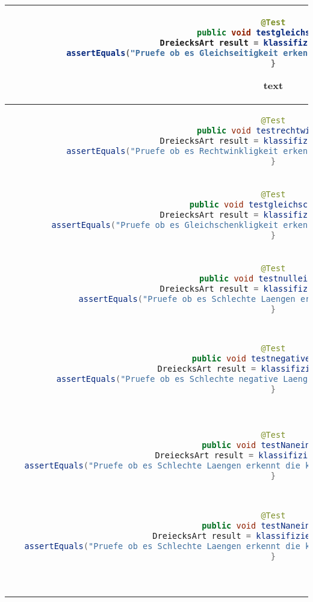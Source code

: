 \begin{parlist}
\begin{center}
\begin{tabular}{ | c | c | }
\begin{lstlisting}[language=java,frame=trBL]
@Test
public void testgleichseitig(){
   DreiecksArt result = klassifiziereDreieck(4,4,4);
   assertEquals("Pruefe ob es Gleichseitigkeit erkennt", DriecksArt.Gliechseitig, result);
}
  \end{lstlisting} text& Need to check if it can recognize equallateral triangles. \\ 
  \hline
  \begin{lstlisting}[language=java,frame=trBL]
@Test
public void testrechtwinklig(){
   DreiecksArt result = klassifiziereDreieck(3,4,5);
   assertEquals("Pruefe ob es Rechtwinkligkeit erkennt", DriecksArt.Rechtwinklig, result);
}
  \end{lstlisting} & Need to check if it can recognize right triangles. \\ 
  \hline
  \begin{lstlisting}[language=java,frame=trBL]
@Test
public void testgleichschenklig(){
   DreiecksArt result = klassifiziereDreieck(4,4,5);
   assertEquals("Pruefe ob es Gleichschenkligkeit erkennt", DriecksArt.Gleichschenklig, result);
}
  \end{lstlisting} &  Need to check if it can recognize isosceles triangles. \\ 
  \hline
  \begin{lstlisting}[language=java,frame=trBL]
@Test
public void testnulleingabe(){
   DreiecksArt result = klassifiziereDreieck(0,4,5);
   assertEquals("Pruefe ob es Schlechte Laengen erkennt", DriecksArt.Normal, result);
}
  \end{lstlisting} &  Need to check if it can recognize invalid lengths. \\ 
 \hline
  \begin{lstlisting}[language=java,frame=trBL]
@Test
public void testnegativeingabe(){
   DreiecksArt result = klassifiziereDreieck(3,-4,5);
   assertEquals("Pruefe ob es Schlechte negative Laengen erkennt", DriecksArt.Normal, result);
}
  \end{lstlisting} &  Need to check if it can recognize invalid lengths that are negative. \\ 
 \hline
\begin{lstlisting}[language=java,frame=trBL]
@Test
public void testNaneingabe(){
   DreiecksArt result = klassifiziereDreieck(3,4,NAN);
   assertEquals("Pruefe ob es Schlechte Laengen erkennt die keine Zahlen sind", DriecksArt.Normal, result);
}
  \end{lstlisting} &  Need to check if it can recognize lengths that are not Numbers. \\ 
 \hline
\begin{lstlisting}[language=java,frame=trBL]
@Test
public void testNaneingabe(){
   DreiecksArt result = klassifiziereDreieck(3,null,5);
   assertEquals("Pruefe ob es Schlechte Laengen erkennt die keine Werte haben", DriecksArt.Normal, result);
}
  \end{lstlisting} &  Need to check if it can recognize lengths that are null. \\ 
\hline
  \begin{lstlisting}[language=java,frame=trBL]


\end{lstlisting}
\end{tabular}
\end{center}
\end{parlist}
